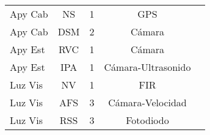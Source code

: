 \begin{table}[H]
\begin{tabular}{|l|c|c|c|c|}
Apy Cab                       & NS                        & 1                                                                                   &     GPS     \\ 
Apy Cab                       & DSM                       & 2                                                                                   &      Cámara    \\ 
Apy Est                       & RVC                       & 1                                                                                  &      Cámara    \\ 
Apy Est                       & IPA                       & 1                                                                                   &      Cámara-Ultrasonido    \\ 
Luz Vis                       & NV                        & 1                                                                                   &     FIR     \\ 
Luz Vis                       & AFS                       & 3                                                                                  &       Cámara-Velocidad   \\
Luz Vis                       & RSS                       & 3                                                                                   &      Fotodiodo    \\  \hline
\end{tabular}
\end{table}
